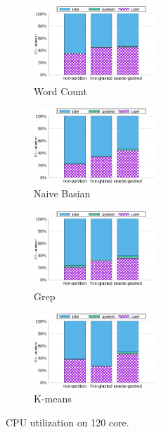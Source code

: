 \begin{figure}[tb]
    \centering
    \begin{subfigure}[b]{0.25\textwidth}
        \includegraphics[width=1.8in]{graph/wc_cpuutils_docker.eps}
        \caption{Word Count}
    \end{subfigure}%
    \begin{subfigure}[b]{0.25\textwidth}
        \includegraphics[width=1.8in]{graph/nb_cpuutils_docker.eps}
        \caption{Naive Basian}
    \end{subfigure}%
    \begin{subfigure}[b]{0.25\textwidth}
        \includegraphics[width=1.8in]{graph/grep_cpuutils_docker.eps}
        \caption{Grep}
    \end{subfigure}%
    \begin{subfigure}[b]{0.25\textwidth}
        \includegraphics[width=1.8in]{graph/kmeans_cpuutils_docker.eps}
        \caption{K-means}
    \end{subfigure}%
        \centering
    \caption{CPU utilization on 120 core.}
    \label{fig:utilization2}
\end{figure}



